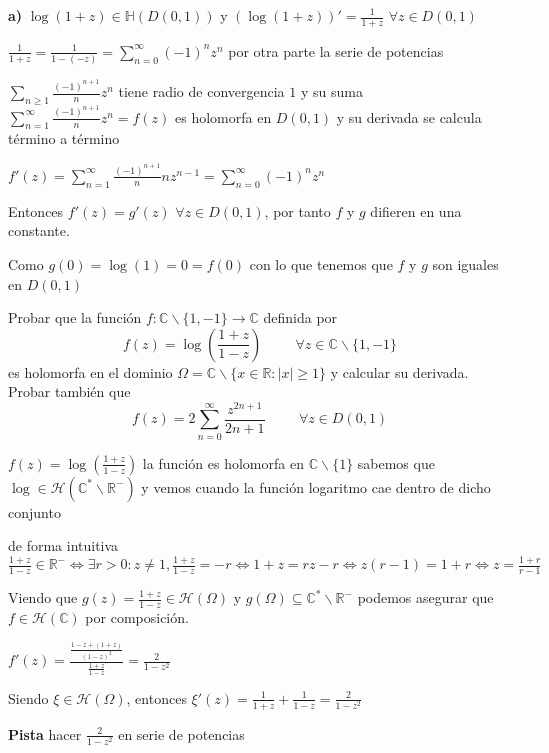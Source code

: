 \begin{sol}

\textbf{a)}
$\log (1+z) \in\mathbb{H}(D(0,1))$ y $(\log (1+z))' = \frac{1}{1+z}$ $\forall z\in D(0,1)$

$\frac{1}{1+z} = \frac{1}{1-(-z)} = \sum_{n=0}^{\infty} (-1)^n z^n$
por otra parte la serie de potencias 

$\sum_{n\geq 1} \frac{(-1)^{n+1}}{n} z^n$ tiene radio de convergencia $1$
y su suma $\sum_{n=1}^{\infty} \frac{(-1)^{n+1}}{n} z^n = f(z)$ es holomorfa en $D(0,1)$ y su derivada se calcula término a término

$f'(z) = \sum_{n=1}^{\infty} \frac{(-1)^{n+1}}{n} n z^{n-1} = \sum_{n=0}^{\infty} (-1)^{n}z^{n}$

Entonces $f'(z) = g'(z)$ $\forall z\in D(0,1)$, por tanto $f$ y $g$ difieren en una constante.

Como $g(0) = \log(1) = 0 = f(0)$
con lo que tenemos que $f$ y $g$ son iguales en $D(0,1)$

\end{sol}




\begin{ejer}
	Probar que la función $f:\mathbb{C}\backslash\{1,-1\}\rightarrow\mathbb{C}$ definida por
	$$ f(z) = \log\left( \frac{1+z}{1-z} \right) \hspace{1cm} \forall z\in\mathbb{C}\backslash\{1,-1\} $$
	es holomorfa en el dominio $\Omega = \mathbb{C}\backslash\{ x\in\mathbb{R} : |x|\geq 1 \}$ y calcular su derivada. Probar también que
	$$ f(z) = 2\sum_{n=0}^{\infty} \frac{z^{2n+1}}{2n+1} \hspace{1cm} \forall z\in D(0,1) $$
\end{ejer}


\begin{sol}

$f(z) = \log(\frac{1+z}{1-z})$
la función es holomorfa en $\mathbb{C}\backslash \{1\}$
sabemos que $\log \in \mathcal{H}(\mathbb{C}^{\ast}\backslash\mathbb{R}^-)$
y vemos cuando la función logaritmo cae dentro de dicho conjunto

de forma intuitiva
$\frac{1+z}{1-z} \in\mathbb{R}^- \Longleftrightarrow \exists r>0 : z\not=1, \frac{1+z}{1-z} = -r \Longleftrightarrow 1+z = rz-r \Longleftrightarrow z(r-1)=1+r \Longleftrightarrow z = \frac{1+r}{r-1}$

Viendo que
$g(z) = \frac{1+z}{1-z} \in\mathcal{H}(\Omega)$ y $g(\Omega) \subseteq \mathbb{C}^{\ast}\backslash \mathbb{R}^-$
podemos asegurar que $f\in\mathcal{H}(\mathbb{C})$ por composición.

$f'(z) = \frac{ \frac{1-z+(1+z)}{(1-z)^2} }{ \frac{1+z}{1-z} } = \frac{2}{1-z^2}$

Siendo $\xi\in\mathcal{H}(\Omega)$, entonces
$\xi '(z) = \frac{1}{1+z} + \frac{1}{1-z} = \frac{2}{1-z^2}$



\textbf{Pista}
hacer $\frac{2}{1-z^2}$ en serie de potencias
\end{sol}





